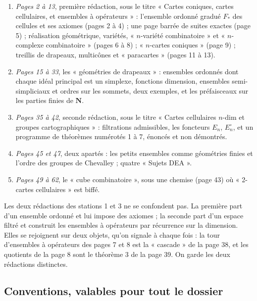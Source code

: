 \documentclass[11pt,a4paper]{article}
\begin{document}
\begin{enumerate}
  \item \emph{Pages 2 à 13}, première rédaction, sous le titre « Cartes
  coniques, cartes cellulaires, et ensembles à opérateurs » : l'ensemble
  ordonné gradué $F_*$ des cellules et ses axiomes (pages 2 à 4) ; une page
  barrée de suites exactes (page 5) ; réalisation géométrique, variétés,
  « $n$-variété combinatoire » et « $n$-complexe combinatoire » (pages 6 à 8) ;
  « $n$-cartes coniques » (page 9) ; treillis de drapeaux, multicônes et
  « paracartes » (pages 11 à 13).
  \item \emph{Pages 15 à 33}, les « géométries de drapeaux » : ensembles
  ordonnés dont chaque idéal principal est un simplexe, fonctions dimension,
  ensembles semi-simpliciaux et ordres sur les sommets, deux exemples, et les
  préfaisceaux sur les parties finies de $\mathbf{N}$.
  \item \emph{Pages 35 à 42}, seconde rédaction, sous le titre « Cartes
  cellulaires $n$-dim et groupes cartographiques » : filtrations admissibles,
  les foncteurs $E_n$, $E_n^\circ$, et un programme de théorèmes numérotés 1 à
  7, énoncés et non démontrés.
  \item \emph{Pages 45 et 47}, deux apartés : les petits ensembles comme
  géométries finies et l'ordre des groupes de Chevalley ; quatre « Sujets
  DEA ».
  \item \emph{Pages 49 à 62}, le « cube combinatoire », sous une chemise
  (page 43) où « 2-cartes cellulaires » est biffé.
\end{enumerate}

Les deux rédactions des stations 1 et 3 ne se confondent pas. La première
part d'un ensemble ordonné et lui impose des axiomes ; la seconde part d'un
espace filtré et construit les ensembles à opérateurs par récurrence sur la
dimension. Elles se rejoignent sur deux objets, qu'on signale à chaque fois :
la tour d'ensembles à opérateurs des pages 7 et 8 est la « cascade » de la
page 38, et les quotients de la page 8 sont le théorème 3 de la page 39. On
garde les deux rédactions distinctes.

\subsection*{Conventions, valables pour tout le dossier}
\end{document}
